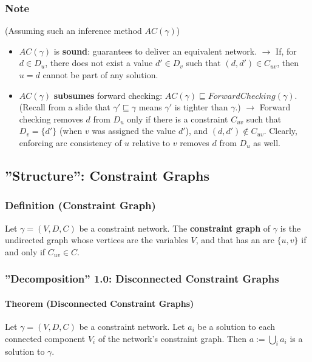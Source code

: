 \documentclass[conference]{styles/acmsiggraph}
\newcommand\subsubsubsection{\paragraph}
\begin{document}
        \subsubsection{Note}
            (Assuming such an inference method $AC(\gamma)$)
            \begin{itemize}
                \item $AC(\gamma)$ is \textbf{sound}: guarantees to deliver an equivalent network.\newline
                $\rightarrow$ If, for $d \in D_u$, there does not exist a value $d' \in D_v$ such that $(d,d') \in C_{uv}$, then $u=d$ cannot be part of any solution.
                \item $AC(\gamma)$ \textbf{subsumes} forward checking: $AC(\gamma) \sqsubseteq ForwardChecking(\gamma)$.\newline
                (Recall from a slide that $\gamma' \sqsubseteq \gamma$ means $\gamma'$ is tighter than $\gamma$.)\newline
                $\rightarrow$ Forward checking removes $d$ from $D_u$ only if there is a constraint $C_{uv}$ such that $D_v = \{d'\}$
                (when $v$ was assigned the value $d'$), and $(d,d') \notin C_{uv}$.
                Clearly, enforcing arc consistency of $u$ relative to $v$ removes $d$ from $D_u$ as well.
            \end{itemize}
    
    
    
    
    
    
    \subsection{''Structure'': Constraint Graphs}
        \subsubsection{Definition (Constraint Graph)}
            Let $\gamma = (V,D,C)$ be a constraint network.
            The \textbf{constraint graph} of $\gamma$ is the undirected graph whose vertices are the variables $V$, and that has an arc $\{u,v\}$ if and only if $C_{uv} \in C$.
        
        \subsubsection{''Decomposition'' 1.0: Disconnected Constraint Graphs}
            \subsubsubsection{Theorem (Disconnected Constraint Graphs)}
                Let $\gamma = (V,D,C)$ be a constraint network.
                Let $a_i$ be a solution to each connected component $V_i$ of the network's constraint graph.
                Then $a := \bigcup\limits_{i} a_i$ is a solution to $\gamma$.\newline
                
\end{document}
